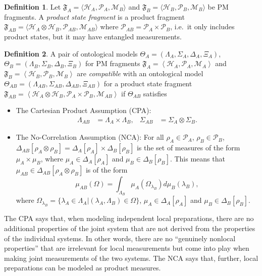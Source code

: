 \documentclass[DIV=calc,fontsize=12pt]{scrartcl} %
\theoremstyle{definition}
\newtheorem{definition}{Definition}[section]
\theoremstyle{plain}
\newcommand{\Hilb}[1][]{\ensuremath{\mathcal{H}_{#1}}}
\begin{document}
\begin{definition}
Let $\mathfrak{F}_A = \langle \Hilb[A], \mathcal{P}_A, \mathcal{M}_B
\rangle$ and $\mathfrak{F}_B = \langle \Hilb[B], \mathcal{P}_B,
\mathcal{M}_B \rangle$ be PM fragments.  A \emph{product state
fragment} is a product fragment $\mathfrak{F}_{AB} = \langle
\Hilb[A] \otimes \Hilb[B], \mathcal{P}_{AB}, \mathcal{M}_{AB}
\rangle$ where $\mathcal{P}_{AB} = \mathcal{P}_A \times
\mathcal{P}_B$, i.e.\ it only includes product states, but it may
have entangled measurements.
\end{definition}

\begin{definition}
A pair of ontological models $\Theta_A = (\Lambda_A, \Sigma_A,
\Delta_A, \Xi_A)$, $\Theta_B = (\Lambda_B, \Sigma_B, \Delta_B,
\Xi_B)$ for PM fragments $\mathfrak{F}_A = \left \langle \Hilb[A],
\mathcal{P}_A, \mathcal{M}_A \right \rangle$ and $\mathfrak{F}_B =
\left \langle \Hilb[B], \mathcal{P}_B, \mathcal{M}_B \right \rangle$
are \emph{compatible} with an ontological model $\Theta_{AB} =
(\Lambda_{AB}, \Sigma_{AB}, \Delta_{AB}, \Xi_{AB})$ for a product
state fragment $\mathfrak{F}_{AB} = \left \langle \Hilb[A] \otimes
\Hilb[B], \mathcal{P}_A \times \mathcal{P}_B, \mathcal{M}_{AB}
\right \rangle$ if $\Theta_{AB}$ satisfies
\begin{itemize}
\item The Cartesian Product Assumption (CPA):
\begin{align}
\Lambda_{AB} & = \Lambda_A \times \Lambda_B, & \Sigma_{AB} & =
\Sigma_A \otimes \Sigma_B.
\end{align}
\item The No-Correlation Assumption (NCA): For all $\rho_A \in
\mathcal{P}_A$, $\rho_B \in \mathcal{P}_B$, $\Delta_{AB}[\rho_A
\otimes \rho_B] = \Delta_A[\rho_A] \times \Delta_B[\rho_B]$ is the
set of measures of the form $\mu_A \times \mu_B$, where $\mu_A \in
\Delta_A[\rho_A]$ and $\mu_B \in \Delta_B[\rho_B]$.  This means
that $\mu_{AB} \in \Delta_{AB}[\rho_A \otimes \rho_B]$ is of the
form
\begin{equation}
\mu_{AB}(\Omega) = \int_{\Lambda_B} \mu_A(\Omega_{\lambda_B}) d
\mu_B(\lambda_B),
\end{equation}
where $\Omega_{\lambda_B} = \{\lambda_A \in \Lambda_A |
(\lambda_A,\Lambda_B) \in \Omega\}$, $\mu_A \in \Delta_A[\rho_A]$
and $\mu_B \in \Delta_B[\rho_B]$.
\end{itemize}
\end{definition}

The CPA says that, when modeling independent local preparations,
there are no additional properties of the joint system that are not
derived from the properties of the individual systems.  In other words,
there are no ``genuinely nonlocal properties'' that are irrelevant for
local measurements but come into play when making joint measurements
of the two systems.  The NCA says that, further, local preparations
can be modeled as product measures.
\end{document}

